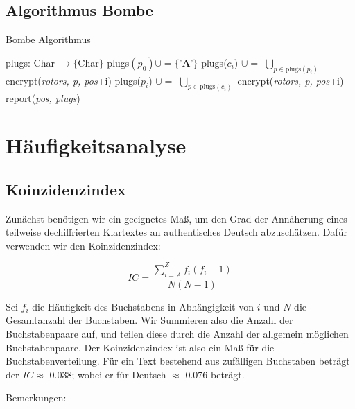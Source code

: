 \documentclass[ngerman, a4paper, footsepline, headsepline]{scrreport}
\begin{document}
	\section{Algorithmus Bombe}
	
	\begin{algorithm}
		\caption{Bombe Algorithmus}
		\begin{algorithmic}[1]
					\State plugs: Char $\rightarrow \{ $Char$\}$
					\State plugs$(p_0) \cup= \{\textbf{'A'}\}$
							\State plugs($c_i$) $\cup=$ $\bigcup_{p \in \text{plugs}(p_i)}$ encrypt(\textsl{rotors, p, pos}+i)
							\State plugs($p_i$) $\cup=$ $\bigcup_{p \in \text{plugs}(c_i)}$ encrypt(\textsl{rotors, p, pos}+i)
						\EndFor
					\EndWhile
						\State report(\textsl{pos, plugs})
					\EndIf
				\EndFor
			\EndProcedure
		\end{algorithmic}
	\end{algorithm}
	
	
	\chapter{Häufigkeitsanalyse}
	\section{Koinzidenzindex}
	\thispagestyle{scrheadings}
	
	Zunächst benötigen wir ein geeignetes Maß, um den Grad der Annäherung eines teilweise dechiffrierten Klartextes an authentisches Deutsch abzuschätzen. Dafür verwenden wir den Koinzidenzindex:
	
	$$
	IC = \frac{\sum_{i=A}^{Z}f_i(f_i-1)}{N(N-1)}
	$$
	
	Sei $f_i$ die Häufigkeit des Buchstabens in Abhängigkeit von $i$ und $N$ die Gesamtanzahl der Buchstaben. Wir Summieren also die Anzahl der Buchstabenpaare auf, und teilen diese durch die Anzahl der allgemein möglichen Buchstabenpaare. Der Koinzidenzindex ist also ein Maß für die Buchstabenverteilung. Für ein Text bestehend aus zufälligen Buchstaben beträgt der $IC \approx$ 0.038; wobei er für Deutsch $\approx$ 0.076 beträgt.
	\newpage
	
	Bemerkungen:
	
\end{document}
